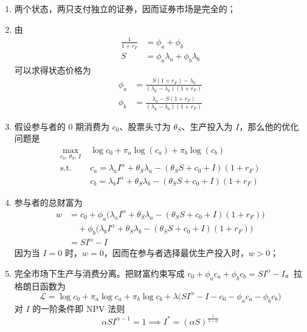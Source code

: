 \begin{solution}
\begin{enumerate}[label=(\alph*)]
    \item 两个状态，两只支付独立的证券，因而证券市场是完全的；
    \item 由
    \[
        \begin{aligned}
            \frac{1}{1+r_{F}}&=\phi_{a}+\phi_{b}\\
            S&=\phi_{a}\lambda_{a}+\phi_{b}\lambda_{b}
        \end{aligned}
    \]
    可以求得状态价格为
    \[
        \begin{aligned}
            \phi_{a}&=\frac{S(1+r_{F})-\lambda_{b}}{(\lambda_{a}-\lambda_{b})(1+r_{F})}\\
            \phi_{b}&=\frac{\lambda_{a}-S(1+r_{F})}{(\lambda_{a}-\lambda_{b})(1+r_{F})}
        \end{aligned}
    \]
    \item 假设参与者的 0 期消费为 $c_{0}$、股票头寸为 $\theta_{S}$、生产投入为 $I$，那么他的优化问题是
    \[
        \begin{aligned}
            \max_{c_{0},\,\theta_{S},\,I}\;&\log c_{0}+\pi_{a}\log(c_{a})+\pi_{b}\log(c_{b})\\
            \text{s.t.}\;&c_{a}=\lambda_{a}I^{\alpha}+\theta_{S}\lambda_{a}-(\theta_{S}S+c_{0}+I)(1+r_{F})\\
            &c_{b}=\lambda_{b}I^{\alpha}+\theta_{S}\lambda_{b}-(\theta_{S}S+c_{0}+I)(1+r_{F})
        \end{aligned}
    \]
    \item 参与者的总财富为
    \[
        \begin{aligned}
            w&=c_{0}+\phi_{a}\bigl(\lambda_{a}I^{\alpha}+\theta_{S}\lambda_{a}-(\theta_{S}S+c_{0}+I)(1+r_{F})\bigr)\\
            &\quad+\phi_{b}\bigl(\lambda_{b}I^{\alpha}+\theta_{S}\lambda_{b}-(\theta_{S}S+c_{0}+I)(1+r_{F})\bigr)\\
            &=SI^{\alpha}-I
        \end{aligned}
    \]
    因为当 $I=0$ 时，$w=0$，因而在参与者选择最优生产投入时，$w>0$；
    \item     完全市场下生产与消费分离。把财富约束写成 $c_{0}+\phi_{a}c_{a}+\phi_{b}c_{b}=SI^{\alpha}-I$。拉格朗日函数为
    \[
        \mathcal{L}=\log c_{0}+\pi_{a}\log c_{a}+\pi_{b}\log c_{b}+\lambda\bigl(SI^{\alpha}-I-c_{0}-\phi_{a}c_{a}-\phi_{b}c_{b}\bigr)
    \]
    对 $I$ 的一阶条件即 NPV 法则
    \[
        \alpha SI^{\alpha-1}=1\implies I^{*}=(\alpha S)^{\frac{1}{1-\alpha}}
\]
\end{enumerate}
\end{solution}
